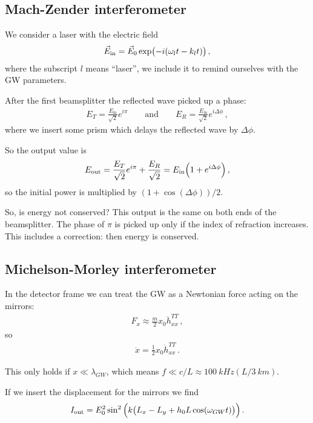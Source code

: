 \documentclass[main.tex]{subfiles}
\begin{document}
\subsection{Mach-Zender interferometer}

We consider a laser with the electric field 
%
\begin{align}
\vec{E} _{\text{in}} = \vec{E}_{0} \exp(-i \qty(\omega_{l} t - k_l t))
\,,
\end{align}
%
where the subscript \(l\) means ``laser'', we include it to remind ourselves with the GW parameters.

After the first beamsplitter the reflected wave picked up a phase: 
%
\begin{align}
E_T = \frac{E _{\text{in}}}{\sqrt{2}} e^{i \pi }
\qquad \text{and} \qquad
E_R = \frac{E _{\text{in}}}{\sqrt{2}} e^{i \Delta \phi } 
\,,
\end{align}
%
where we insert some prism which delays the reflected wave by \(\Delta \phi \). 

So the output value is 
%
\begin{align}
E _{\text{out}} = \frac{E_{T}}{\sqrt{2}} e^{i \pi }
+ \frac{E_{R}}{\sqrt{2}} = E _{\text{in}} \qty(1 + e^{i \Delta \phi })
\,,
\end{align}
%
so the initial power is multiplied by \((1 + \cos( \Delta \phi )) / 2 \). 

So, is energy not conserved? This output is the same on both ends of the beamsplitter. The phase of \(\pi \) is picked up only if the index of refraction increases. This includes a correction: then energy is conserved.

\subsection{Michelson-Morley interferometer}

In the detector frame we can treat the GW as a Newtonian force acting on the mirrors: 
%
\begin{align}
F_{x} \approx \frac{m}{2} x_0 \ddot{h}_{xx}^{TT} 
\,,
\end{align}
%
so 
%
\begin{align}
\ddot{x} = \frac{1}{2} x_0 \ddot{h}^{TT}_{xx}
\,.
\end{align}

This only holds if \(x \ll \lambda_{GW}\), which means \(f \ll c/ L  \approx \SI{100}{kHz} (L / \SI{3}{km} )\).

If we insert the displacement for the mirrors we find 
%
\begin{align}
I _{\text{out}} = E_0^2 \sin^2 \qty(k \qty(L_x - L_y + h_0 L \cos(\omega_{GW} t)))
\,.
\end{align}
%
\end{document}
